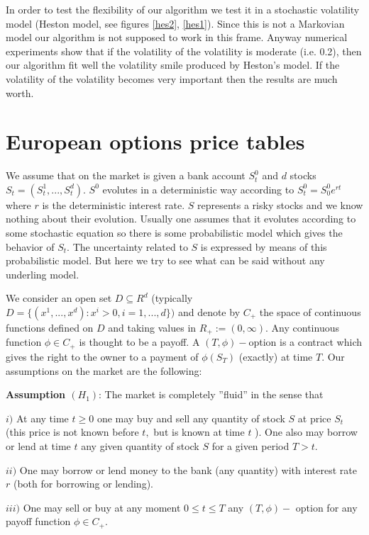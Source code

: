 \documentclass[a4paper]{article}
\begin{document}
In order to test the flexibility of our algorithm we test it in a
stochastic volatility model (Heston model, see figures \ref{hes2},
\ref{hes1}). Since this is not a Markovian model our algorithm is
not supposed to work in this frame. Anyway numerical experiments
show that if the volatility of the volatility is moderate (i.e.
0.2), then our algorithm fit well the volatility smile produced by
Heston's model. If the volatility of the volatility becomes very
important then the results are much worth.

\section{European options price tables}

We assume that on the market is given a bank account $S_{t}^{0}$ and $d$
stocks $S_{t}=(S_{t}^{1},...,S_{t}^{d}).$ $S^{0}$ evolutes in a
deterministic way according to $S_{t}^{0}=S_{0}^{0}e^{rt}$ where $r$ is the
deterministic interest rate. $S$ represents a risky stocks and we know
nothing about their evolution. Usually one assumes that it evolutes
according to some stochastic equation so there is some probabilistic model
which gives the behavior of $S_{t}.$ The uncertainty related to $S$ is
expressed by means of this probabilistic model. But here we try to see what
can be said without any underling model.

We consider an open set $D\subseteq R^{d}$ (typically $D=%
\{(x^{1},...,x^{d}):x^{i}>0,i=1,...,d\})$ and denote by $C_{+}$ the space of
continuous functions defined on $D$ and taking values in $R_{+}:=(0,\infty
). $ Any continuous function $\phi \in C_{+}$ is thought to be a payoff. A $%
(T,\phi )-$option is a contract which gives the right to the owner to a
payment of $\phi (S_{T})$ (exactly) at time $T$. Our assumptions on the
market are the following:

{\bf Assumption $(H_{1})$}: The market is completely ''fluid'' in the
sense that

$i)$ At any time $t\geq 0$ one may buy and sell any quantity of stock
$S$ at price $S_{t}$ (this price is not known before $t,$ but is known
at time $t$ ). One also may borrow or lend at time $t$ any given
quantity of stock $S$ for a given period $T>t$.

$ii)$ One may borrow or lend money to the bank (any quantity) with interest
rate $r$ (both for borrowing or lending).

$iii)$ One may sell or buy at any moment $0\leq t\leq T$ any $(T,\phi )-$
option for any payoff function $\phi \in C_{+}.$
\end{document}
